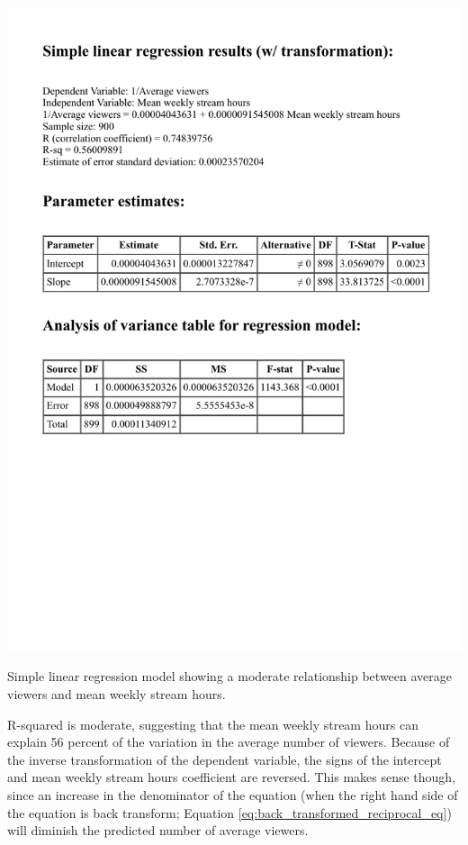 \documentclass[12pt]{article}
\begin{document}

\begin{table}[!ht]
  \centering %
  \includegraphics[scale=0.75]{../StatCrunch_Results/reciprocal/regression_table}
  \captionsetup{justification=raggedright, singlelinecheck=false, margin=2cm}
  \caption[Regression: Average Viewers Predicted by Stream Hours]{Simple linear regression model showing a moderate relationship between average viewers and mean weekly stream hours.}
  \label{table:reciprocal_regression_table}
\end{table}

R-squared is moderate, suggesting that the mean weekly stream hours can explain 56 percent of the variation in the average number of viewers. Because of the inverse transformation of the dependent variable, the signs of the intercept and mean weekly stream hours coefficient are reversed. This makes sense though, since an increase in the denominator of the equation (when the right hand side of the equation is back transform; Equation \ref{eq:back_transformed_reciprocal_eq}) will diminish the predicted number of average viewers.
\end{document}
